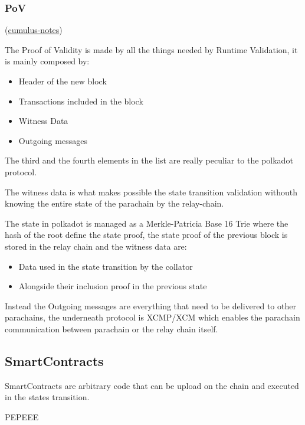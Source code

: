 \documentclass[../main.tex]{subfiles}
\begin{document}
\subsubsection{PoV}
(\href{https://github.com/paritytech/cumulus/blob/master/docs/overview.md}{cumulus-notes})

The Proof of Validity is made by all the things needed by Runtime Validation, it is mainly composed by:

\begin{itemize}
  \item Header of the new block
  \item Transactions included in the block
  \item Witness Data
  \item Outgoing messages
\end{itemize}

The third and the fourth elements in the list are really peculiar to the polkadot protocol.

The witness data is what makes possible the state transition validation withouth knowing the entire state of the parachain by the relay-chain.

The state in polkadot is managed as a Merkle-Patricia Base 16 Trie where the hash of the root define the state proof, the state proof of the previous block is stored in the relay chain and the witness data are:

\begin{itemize}
  \item Data used in the state transition by the collator
  \item Alongside their inclusion proof in the previous state
\end{itemize}

Instead the Outgoing messages are everything that need to be delivered to other parachains, the underneath protocol is XCMP/XCM which enables the parachain communication between parachain or the relay chain itself.

\subsection{SmartContracts}

SmartContracts are arbitrary code that can be upload on the chain and executed in the states transition.



PEPEEE

\end{document}
